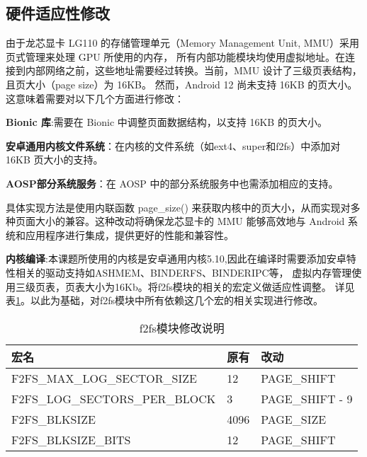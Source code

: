 








\subsection{硬件适应性修改}
由于龙芯显卡 LG110 的存储管理单元（Memory Management Unit, MMU）采用页式管理来处理 GPU 所使用的内存，
所有内部功能模块均使用虚拟地址。在连接到内部网络之前，这些地址需要经过转换。当前，MMU 设计了三级页表结构，且页大小（page size）为 16KB。
然而，Android 12 尚未支持 16KB 的页大小。这意味着需要对以下几个方面进行修改：

\textbf{Bionic 库}:需要在 Bionic 中调整页面数据结构，以支持 16KB 的页大小。

\textbf{安卓通用内核文件系统}：在内核的文件系统（如ext4、super和f2fs）中添加对 16KB 页大小的支持。

\textbf{AOSP部分系统服务}：在 AOSP 中的部分系统服务中也需添加相应的支持。

具体实现方法是使用内联函数 page\_size() 来获取内核中的页大小，从而实现对多种页面大小的兼容。这种改动将确保龙芯显卡的 MMU 
能够高效地与 Android 系统和应用程序进行集成，提供更好的性能和兼容性。


\textbf{内核编译}:本课题所使用的内核是安卓通用内核5.10,因此在编译时需要添加安卓特性相关的驱动支持如ASHMEM、BINDERFS、BINDERIPC等，
虚拟内存管理使用三级页表，页表大小为16Kb。将f2fs模块的相关的宏定义做适应性调整。
详见表\ref{tab:f2fs模块修改说明}。以此为基础，对f2fs模块中所有依赖这几个宏的相关实现进行修改。
\begin{table}[h]
  \centering
  \caption{f2fs模块修改说明}
  \label{tab:f2fs模块修改说明}
  \begin{tabular}{lll}
    \toprule
    宏名   &   原有  &改动  \\
    \midrule
    F2FS\_MAX\_LOG\_SECTOR\_SIZE & 12 & PAGE\_SHIFT \\
    F2FS\_LOG\_SECTORS\_PER\_BLOCK & 3 & PAGE\_SHIFT - 9 \\
    F2FS\_BLKSIZE & 4096 & PAGE\_SIZE \\
    F2FS\_BLKSIZE\_BITS & 12 & PAGE\_SHIFT \\
    \bottomrule
  \end{tabular}
  \note{}
\end{table}

